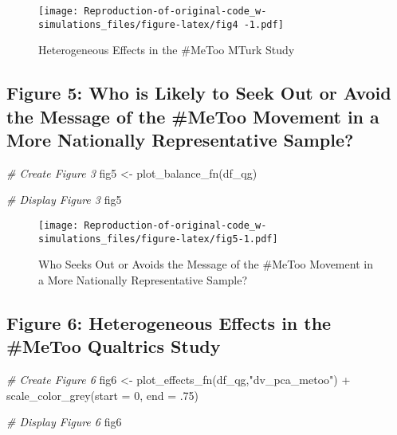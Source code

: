 \documentclass[
]{article}
\newenvironment{Shaded}{\begin{snugshade}}{\end{snugshade}}
\newcommand{\AttributeTok}[1]{\textcolor[rgb]{0.77,0.63,0.00}{#1}}
\newcommand{\CommentTok}[1]{\textcolor[rgb]{0.56,0.35,0.01}{\textit{#1}}}
\newcommand{\DecValTok}[1]{\textcolor[rgb]{0.00,0.00,0.81}{#1}}
\newcommand{\FunctionTok}[1]{\textcolor[rgb]{0.00,0.00,0.00}{#1}}
\newcommand{\NormalTok}[1]{#1}
\newcommand{\OtherTok}[1]{\textcolor[rgb]{0.56,0.35,0.01}{#1}}
\newcommand{\SpecialCharTok}[1]{\textcolor[rgb]{0.00,0.00,0.00}{#1}}
\newcommand{\StringTok}[1]{\textcolor[rgb]{0.31,0.60,0.02}{#1}}
\begin{document}
\begin{figure}
\centering
\texttt{[image: Reproduction-of-original-code\_w-simulations\_files/figure-latex/fig4 -1.pdf]}
\caption{Heterogeneous Effects in the \#MeToo MTurk Study}
\end{figure}

\hypertarget{figure-5-who-is-likely-to-seek-out-or-avoid-the-message-of-the-metoo-movement-in-a-more-nationally-representative-sample}{%
\subsection{Figure 5: Who is Likely to Seek Out or Avoid the Message of
the \#MeToo Movement in a More Nationally Representative
Sample?}\label{figure-5-who-is-likely-to-seek-out-or-avoid-the-message-of-the-metoo-movement-in-a-more-nationally-representative-sample}}

\begin{Shaded}
\begin{Highlighting}[]
\CommentTok{\# Create Figure 3}
\NormalTok{fig5 }\OtherTok{\textless{}{-}} \FunctionTok{plot\_balance\_fn}\NormalTok{(df\_qg)}

\CommentTok{\# Display Figure 3}
\NormalTok{fig5}
\end{Highlighting}
\end{Shaded}

\begin{figure}
\centering
\texttt{[image: Reproduction-of-original-code\_w-simulations\_files/figure-latex/fig5-1.pdf]}
\caption{Who Seeks Out or Avoids the Message of the \#MeToo Movement in
a More Nationally Representative Sample?}
\end{figure}

\hypertarget{figure-6-heterogeneous-effects-in-the-metoo-qualtrics-study}{%
\subsection{Figure 6: Heterogeneous Effects in the \#MeToo Qualtrics
Study}\label{figure-6-heterogeneous-effects-in-the-metoo-qualtrics-study}}

\begin{Shaded}
\begin{Highlighting}[]
\CommentTok{\# Create Figure 6}
\NormalTok{fig6 }\OtherTok{\textless{}{-}} \FunctionTok{plot\_effects\_fn}\NormalTok{(df\_qg,}\StringTok{"dv\_pca\_metoo"}\NormalTok{) }\SpecialCharTok{+} \FunctionTok{scale\_color\_grey}\NormalTok{(}\AttributeTok{start =} \DecValTok{0}\NormalTok{, }\AttributeTok{end =}\NormalTok{ .}\DecValTok{75}\NormalTok{) }

\CommentTok{\# Display Figure 6}
\NormalTok{fig6 }
\end{Highlighting}
\end{Shaded}
\end{document}

